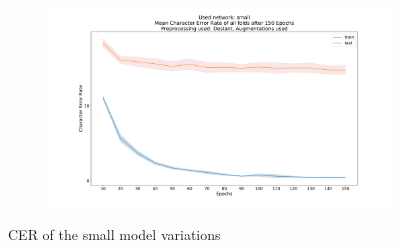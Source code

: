 \documentclass{article}
\begin{document}
\begin{minipage}[!h]{1\linewidth}
\begin{figure}[H]
\begin{adjustwidth}{-8em}{-8em}
\begin{subfigure}{0.7\textwidth}
    \end{subfigure}
    \begin{subfigure}{0.7\textwidth}
        \centering
        \includegraphics[width=\textwidth]{Deslant_small_150_augmentations_cer}
    \end{subfigure}
    \end{adjustwidth}
\caption{CER of the small model variations}

\label{fig:CERSmall}
\end{figure}
\end{minipage}
\end{document}
